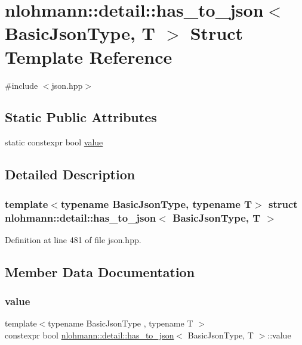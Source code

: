 \hypertarget{structnlohmann_1_1detail_1_1has__to__json}{}\section{nlohmann\+:\+:detail\+:\+:has\+\_\+to\+\_\+json$<$ Basic\+Json\+Type, T $>$ Struct Template Reference}
\label{structnlohmann_1_1detail_1_1has__to__json}


{\ttfamily \#include $<$json.\+hpp$>$}

\subsection*{Static Public Attributes}
\begin{DoxyCompactItemize}
\item 
static constexpr bool \hyperlink{structnlohmann_1_1detail_1_1has__to__json_a18e260c3c6f10328637c4427d3cb3a31}{value}
\end{DoxyCompactItemize}


\subsection{Detailed Description}
\subsubsection*{template$<$typename Basic\+Json\+Type, typename T$>$\newline
struct nlohmann\+::detail\+::has\+\_\+to\+\_\+json$<$ Basic\+Json\+Type, T $>$}



Definition at line 481 of file json.\+hpp.



\subsection{Member Data Documentation}
\mbox{\label{structnlohmann_1_1detail_1_1has__to__json_a18e260c3c6f10328637c4427d3cb3a31}} 
\subsubsection{\texorpdfstring{value}{value}}
{\footnotesize\ttfamily template$<$typename Basic\+Json\+Type , typename T $>$ \\
constexpr bool \hyperlink{structnlohmann_1_1detail_1_1has__to__json}{nlohmann\+::detail\+::has\+\_\+to\+\_\+json}$<$ Basic\+Json\+Type, T $>$\+::value\hspace{0.3cm}{\ttfamily [static]}}

